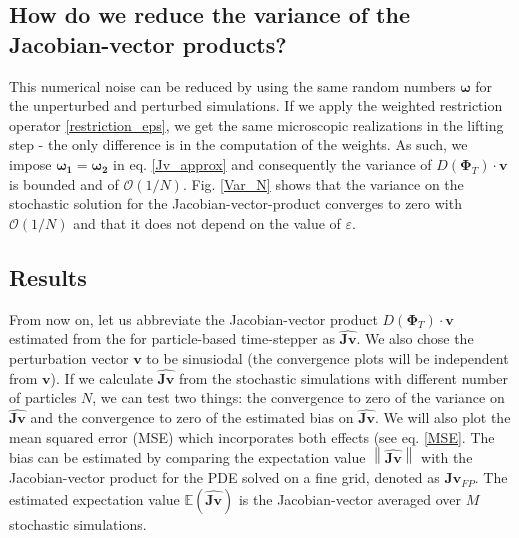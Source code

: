 \documentclass[]{article}
\newcommand{\norm}[1]{\left\|#1\right\|} %
\newcommand{\cts}{\ensuremath{\boldsymbol{\Phi}_T}} %
\newcommand{\V}{\ensuremath{\mathbf{v}}}
\newcommand{\jv}{\ensuremath{\mathbf{\hat{Jv}}}}
\newcommand{\jvpde}{\ensuremath{\mathbf{Jv}_{FP}}}
\begin{document}
\subsection{How do we reduce the variance of the Jacobian-vector products?}
This numerical noise can be reduced by using the same random numbers $\boldsymbol{\omega}$ for the unperturbed and perturbed simulations. If we apply the weighted restriction operator \eqref{restriction_eps},  we get the same microscopic realizations in the lifting step - the only difference is in the computation of the weights. As such,  we impose $\boldsymbol{\omega_1} = \boldsymbol{\omega_2}$ in eq. \eqref{Jv_approx} and consequently
the variance of $D(\cts) \cdot \mathbf{v}$ is bounded and of  $\mathcal{O}(1/ N)$.  Fig. \ref{Var_N} shows that the variance on the stochastic solution for the Jacobian-vector-product converges to zero with $\mathcal{O}(1/ N)$ and that it does not depend on the value of $\varepsilon$.


\subsection{Results}

From now on, let us abbreviate the Jacobian-vector product $D(\cts) \cdot \mathbf{v}$  estimated from the for particle-based time-stepper as $\jv$.  We also chose the perturbation vector $\V$ to be sinusiodal  (the convergence plots will be  independent from $\V$). If we calculate $\jv$ from the stochastic simulations with different number of particles $N$, we can test two things: the convergence to zero of the variance on $\jv$ and the convergence to zero of the estimated bias on $\jv$.  We will also plot the mean squared error (MSE) which incorporates both effects (see eq. \eqref{MSE}. 
The bias can be estimated by comparing the expectation value $\norm{\jv}$ with the Jacobian-vector product for the PDE solved on a fine grid, denoted as $\jvpde$. The estimated expectation value $\mathbb{E}(\jv)$ is the Jacobian-vector averaged over $M$ stochastic simulations. 

\end{document}
